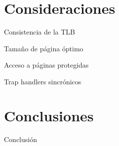 \documentclass[xcolor=pdftex,dvipsnames,usenames,table]{beamer}
\begin{document}
\section{Consideraciones}

\begin{frame}{Consistencia de la TLB}
\end{frame}

\begin{frame}{Tamaño de página óptimo}
\end{frame}

\begin{frame}{Acceso a páginas protegidas}
\end{frame}

\begin{frame}{Trap handlers sincrónicos}
\end{frame}

\section{Conclusiones}

\begin{frame}{Conclusión}
\end{frame}
\end{document}
